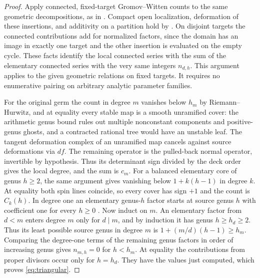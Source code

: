 \begin{proof}
Apply connected, fixed-target Gromov--Witten counts to the same
geometric decompositions, as in \cite[\S7]{WueProduct}. Compact open
localization, deformation of these insertions, and additivity on a
partition hold by \cite[Lemma~3.8 and Proposition~3.10]{diw}.
On disjoint targets the connected contributions add for normalized
factors, since the domain has an image in exactly one target and the
other insertion is evaluated on the empty cycle. These facts identify
the local connected series with the sum of the elementary connected
series with the very same integers $n_{d,h}$. This argument applies
to the given geometric relations on fixed targets. It requires no
enumerative pairing on arbitrary analytic parameter families.

For the original germ the count in degree $m$ vanishes below
$h_m$ by Riemann--Hurwitz, and at equality every stable map is a smooth unramified cover:
the arithmetic genus bound rules out multiple nonconstant components
and positive-genus ghosts, and a contracted rational tree would have
an unstable leaf. The tangent deformation complex of an unramified
map cancels against source deformations via $df$. The remaining
operator is the pulled-back normal operator, invertible by hypothesis.
Thus its determinant sign divided by the deck order gives the local
degree, and the sum is $c_m$. For a balanced elementary core of
genus $h\ge2$, the same argument gives vanishing below
$1+k(h-1)$ in degree $k$. At equality both spin lines coincide,
so every cover has sign $+1$ and the count is $C_k(h)$.
In degree one an elementary genus-$h$ factor starts at source genus
$h$ with coefficient one for every $h\ge0$
\cite[Proposition~3.3]{ip}. Now induct on $m$.
An elementary factor from $d<m$ enters degree $m$ only for $d\mid m$,
and by induction it has genus $h\ge h_d\ge2$. Thus its least possible
source genus in degree $m$ is
$1+(m/d)(h-1)\ge h_m$. Comparing the degree-one terms of the remaining
genus factors in order of increasing genus gives $n_{m,h}=0$ for
$h<h_m$. At equality the contributions from proper divisors occur
only for $h=h_d$. They have the values just computed, which proves
\eqref{eq:triangular}.
\end{proof}



